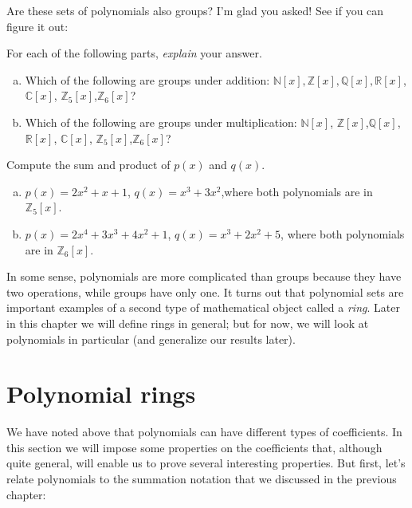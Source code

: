 Are these sets of polynomials also groups? I'm glad you asked! See if you can figure it out:

\begin{exercise}
For each of the following parts, \emph{explain} your answer. 
\begin{enumerate}[(a)]
\item
Which of the following are groups under addition: $\mathbb{N}[x], \mathbb{Z}[x], \mathbb{Q}[x], \mathbb{R}[x]$, $\mathbb{C}[x]$, $\mathbb{Z}_5[x]$,$\mathbb{Z}_6[x]$? 
\item
Which of the following are groups under multiplication: $\mathbb{N}[x]$, $\mathbb{Z}[x]$,$\mathbb{Q}[x]$,$\mathbb{R}[x]$, $\mathbb{C}[x]$, $\mathbb{Z}_5[x]$,$\mathbb{Z}_6[x]$? 

\end{enumerate}
\end{exercise}

\begin{exercise}
Compute the sum and product of $p(x)$ and $q(x)$.
\begin{enumerate}[(a)]
\item
$p(x)= 2x^2 + x + 1$, $q(x)=x^3 +3x^2$,where both polynomials are in $\mathbb{Z}_5[x]$.
\item
$p(x)= 2x^4 + 3x^3 + 4x^2+1$, $q(x)=x^3 +2x^2+5$, where both polynomials are in $\mathbb{Z}_6[x]$.
\end{enumerate}
\end{exercise}

In some sense, polynomials are more complicated than groups because they have two operations, while groups have only one. It turns out that polynomial sets are important examples of a second type of mathematical object called a \emph{ring}. Later in this chapter we will define rings in general; but for now, we will look at polynomials in particular (and generalize our results later).

\section {Polynomial rings}
 We have noted above that polynomials can have different types of coefficients. 
In this section we will  impose some properties on the coefficients that, although quite general, will enable us to prove several interesting properties. But first, let's relate polynomials to the summation notation that we discussed in the previous chapter:

